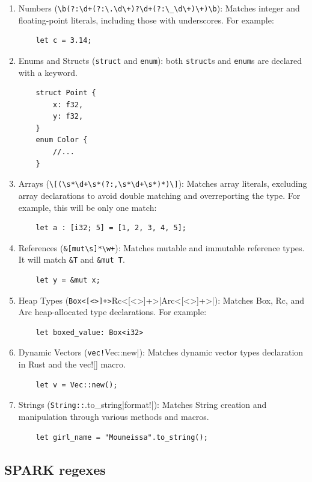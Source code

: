 \documentclass[nomenclature, english, bibtex]{kththesis}
\begin{document}
\begin{enumerate}
    \item Numbers (\verb|\b(?:\d+(?:\.\d\+)?\d+(?:\_\d\+)\+)\b|): Matches integer and floating-point literals, including those with underscores. For example:
    \begin{verbatim}
    let c = 3.14;
    \end{verbatim}
    \item Enums and Structs (\verb|struct| and \verb|enum|): both \texttt{struct}s and \texttt{enum}s are declared with a keyword. 
    \begin{verbatim}
    struct Point {
        x: f32,
        y: f32,
    }
    enum Color {
        //...
    }
    \end{verbatim}
    \item Arrays (\verb|\[(\s*\d+\s*(?:,\s*\d+\s*)*)\]|): Matches array literals, excluding array declarations to avoid double matching and overreporting the type. For example, this will be only one match:
    \begin{verbatim}
    let a : [i32; 5] = [1, 2, 3, 4, 5];  
    \end{verbatim}
    \item References (\verb|&[mut\s]*\w+|): Matches mutable and immutable reference types. It will match \texttt{\&T} and \texttt{\&mut T}.
    \begin{verbatim}
    let y = &mut x;  
    \end{verbatim}
    \item Heap Types (\verb|Box<[<>]+>|Rc<[<>]+>|Arc<[<>]+>|): Matches Box, Rc, and Arc heap-allocated type declarations. For example:
    \begin{verbatim}
    let boxed_value: Box<i32>
    \end{verbatim}
    \item Dynamic Vectors (\verb|vec!|Vec::new|): Matches dynamic vector types declaration in Rust and the vec![] macro.
    \begin{verbatim}
    let v = Vec::new();
    \end{verbatim}
    \item Strings (\verb|String::|.to\_string|format!|): Matches String creation and manipulation through various methods and macros.
    \begin{verbatim}
    let girl_name = "Mouneissa".to_string();
    \end{verbatim}
\end{enumerate}
 
\subsection{SPARK regexes}
\end{document}
